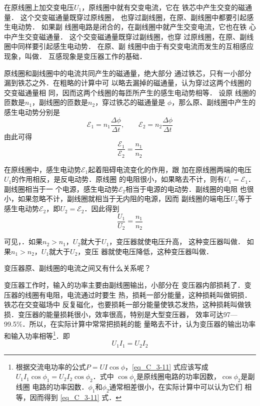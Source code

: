 在原线圈上加交变电压$U_1$，原线圈中就有交变电流，它在
铁芯中产生交变的磁通量．
这个交变磁通量既穿过原线圈，
也穿过副线圈，在原、副线圈中都要引起感生电动势．
如果副
线圈电路是闭合的，在副线圈中就产生交变电流，它也在铁
心中产生交变磁通量．
这个交变磁通量既穿过副线圈，也穿
过原线圈，在原、副线圈中同样要引起感生电动势．
在原、副
线圈中由于有交变电流而发生的互相感应现象，叫做．
互感现象是变压器工作的基础．

原线圈和副线圈中的电流共同产生的磁通量，绝大部分
通过铁芯，只有一小部分漏到铁芯之外．在粗略的计算中可
以略去漏掉的磁通量，认为穿过这两个线圈的交变磁通量相
同，因而这两个线圈的每匝所产生的感生电动势相等．
设原
线圈的匝数是$n_1$，副线圈的匝数是$n_2$，穿过铁芯的磁通量是
$\phi$，那么原、副线圈中产生的感生电动势分别是
\[\mathcal{E}_1=n_1\frac{\Delta \phi}{\Delta t},\qquad  \mathcal{E}_2=n_2\frac{\Delta \phi}{\Delta t}\]
由此可得
\begin{equation}\label{eq_C_3-9}
    \frac{\mathcal{E}_1}{\mathcal{E}_2}=\frac{n_1}{n_2} 
\end{equation}

在原线圈中，感生电动势$\mathcal{E}_1$起着阻碍电流变化的作用，跟
加在原线圈两端的电压$U_1$的作用相反，是反电动势．原线圈
的电阻很小，如果略去不计，则有$U_1=\mathcal{E}_1$．副线圈相当于一
个电源，感生电动势$\mathcal{E}_2$相当于电源的电动势．副线圈的电阻
也很小，如果忽略不计，副线圈就相当于无内阻的电源，因而
副线圈的端电压$U_2$等于感生电动势$\mathcal{E}_2$，即$U_2=\mathcal{E}_2$．因此得到
\begin{equation}\label{eq_C_3-10}
    \frac{U_1}{U_2}=\frac{n_1}{n_2} 
\end{equation}

可见，．如果$n_2>n_1$，$U_2$就大于$U_1$，变压器就使电压升高，
这种变压器叫做．
如果$n_1>n_2$，$U_1$就大于$U_2$，变压
器就使电压降低，这种变压器叫做．

变压器原、副线圈的电流之间又有什么关系呢？

变压器工作时，输入的功率主要由副线圈输出，小部分在
变压器内部损耗了．变压器的线圈有电阻，电流通过时要生
热，损耗一部分能量，这种损耗叫做铜损．铁芯在交变磁场中
反复磁化，也要损耗一部分能量使铁芯发热，这种损耗叫做铁
损．变压器的能量损耗很小，效率很高，特别是大型变压器，
效率可达97—99.5\%．所以，在实际计算中常常把损耗的能
量略去不计，认为变压器的输出功率和输入功率相等\footnote{根据交流电功率的公式$P=UI\cos\phi$，\eqref{eq_C_3-11} 式应该写成$U_1I_1\cos\phi_1
=U_2I_2\cos\phi_2$．式中 $\cos\phi_1$是原线圈电路的功率因数，$\cos\phi_2$是副线圈
电路的功率因数．$\phi_1$和$\phi_2$通常相差很小，在实际计算中可以认为它们
相等，因而得到 \eqref{eq_C_3-11} 式．}．即
\begin{equation}\label{eq_C_3-11}
    U_1I_1=U_2I_2
\end{equation}

